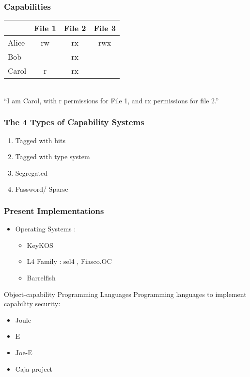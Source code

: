\documentclass[xcolor=table]{beamer}
\begin{document}
\begin{frame}
  \frametitle{Capabilities}
  \begin{center}
    \begin{tabular}{|l||c|c|c|}
      \hline
      &File 1&File 2&File 3\\
      \hline
      \hline
      Alice&rw&rx&rwx\\
      \hline
      Bob&&rx&\\
      \hline
      \cellcolor{green}Carol&\cellcolor{green}r&\cellcolor{green}rx&\cellcolor{green}\\
      \hline
    \end{tabular}\\
    \vspace{10pt}
    ``I am Carol, with r permissions for File 1, and rx permissions for file 2.''
  \end{center}
\end{frame}

\begin{frame}
  \frametitle{The 4 Types of Capability Systems}
  
\begin{enumerate}
    \item{Tagged with bits}
    \item{Tagged with type system}
    \item{Segregated}
    \item{Password/ Sparse}
\end{enumerate}
 \end{frame}

\begin{frame}
    \frametitle{Present Implementations}
     \begin{itemize}
         \item Operating Systems :
         \begin{itemize}
             \item KeyKOS
             \item L4 Family : sel4 , Fiasco.OC
             \item Barrelfish
         \end{itemize}
     \end{itemize}
\end{frame}

\begin{frame}{Object-capability Programming Languages}
Programming languages to implement capability security:
\begin{itemize}
    \item Joule
    \item E
    \item Joe-E
    \item Caja project
\end{itemize}
\end{frame}
\end{document}
